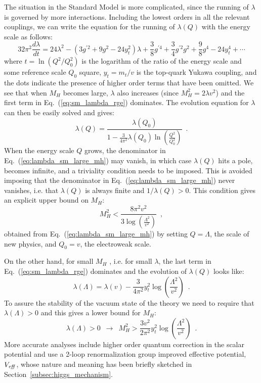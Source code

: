 \documentclass[12pt,prd,onecolumn,aps,floats,superscriptaddress,floatfix,nofootinbib]{revtex4-2}
\begin{document}
The situation in the Standard Model is more complicated, since the
running of $\lambda$ is governed by more interactions. Including the
lowest orders in all the relevant couplings, we can write the equation
for the running of $\lambda(Q)$ with the energy scale as follows:
\begin{equation}
\label{eq:sm_lambda_rge}
32\pi^2\frac{d\lambda}{dt}=
24\lambda^2-(3g^{\prime 2}+9g^2-24y_t^2)\lambda
+\frac{3}{8}g^{\prime 4}+\frac{3}{4}g^{\prime 2}g^2+\frac{9}{8}g^4
-24y_t^4+\cdots
\end{equation}
where $t\!=\!\ln(Q^2/Q_0^2)$ is the logarithm of the ratio of the
energy scale and some reference scale $Q_0$ square, $y_t\!=\!m_t/v$ is
the top-quark Yukawa coupling, and the dots indicate the presence of
higher order terms that have been omitted. We see that when $M_H$
becomes large, $\lambda$ also increases (since $M_H^2\!=\!2\lambda
v^2$) and the first term in Eq.~(\ref{eq:sm_lambda_rge})
dominates. The evolution equation for $\lambda$ can then be easily
solved and gives:
\begin{equation}
\label{eq:lambda_sm_large_mh}
\lambda(Q)=\frac{\lambda(Q_0)}{1-\frac{3}{4\pi^2}\lambda(Q_0)
\ln\left(\frac{Q^2}{Q_0^2}\right)}\,\,\,.
\end{equation}
When the energy scale $Q$ grows, the
denominator in Eq.~(\ref{eq:lambda_sm_large_mh}) may vanish, in which
case $\lambda(Q)$ hits a pole, becomes infinite, and a triviality
condition needs to be imposed. This is avoided imposing that the
denominator in Eq.~(\ref{eq:lambda_sm_large_mh}) never vanishes, i.e. 
that $\lambda(Q)$ is always finite
and $1/\lambda(Q)>0$. This condition gives an explicit upper bound on
$M_H$:
\begin{equation}
M_H^2<\frac{8\pi^2v^2}{3\log\left(\frac{\Lambda^2}{v^2}\right)}\,\,\,,
\end{equation}
obtained from Eq.~(\ref{eq:lambda_sm_large_mh}) by setting
$Q\!=\!\Lambda$, the scale of new physics, and $Q_0\!=\!v$, the
electroweak scale.

On the other hand, for small $M_H$ , i.e. for small $\lambda$, the
last term in Eq.~(\ref{eq:sm_lambda_rge}) dominates and the
evolution of $\lambda(Q)$ looks like:
\begin{equation}
\lambda(\Lambda)=\lambda(v)-\frac{3}{4\pi^2}y_t^2
\log\left(\frac{\Lambda^2}{v^2}\right)\,\,\,.
\end{equation}
To assure the stability of the vacuum state of the theory we need to
require that $\lambda(\Lambda)\!>\!0$ and this gives a lower bound for
$M_H$:
\begin{equation}
\lambda(\Lambda)>0 \,\,\,\longrightarrow \,\,\,
M_H^2>\frac{3v^2}{2\pi^2}y_t^2\log\left(\frac{\Lambda^2}{v^2}\right)\,\,\,.
\end{equation}
More accurate analyses include higher order quantum correction in the
scalar potential and use a 2-loop renormalization group improved
effective potential, $V_{\it eff}$, whose nature and meaning has been
briefly sketched in Section~\ref{subsec:higgs_mechanism}.
\end{document}
